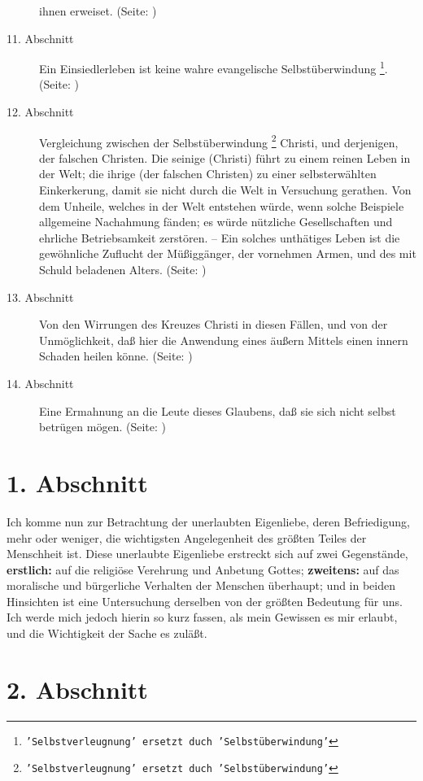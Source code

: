 \begin{description}
ihnen erweiset. (Seite: \pageref{kap5_ab10})
\item[11. Abschnitt] Ein Einsiedlerleben ist keine wahre evangelische
Selbstüberwindung \footnote{\texttt{'Selbstverleugnung' ersetzt duch
'Selbstüberwindung'}}. (Seite: \pageref{kap5_ab11})
\item[12. Abschnitt] Vergleichung zwischen der Selbstüberwindung
\footnote{\texttt{'Selbstverleugnung' ersetzt duch 'Selbstüberwindung'}} Christi, und
derjenigen, der falschen Christen. Die seinige (Christi) führt zu einem reinen
Leben in
der Welt; die ihrige (der falschen Christen) zu einer selbsterwählten
Einkerkerung, damit sie nicht
durch die Welt in Versuchung gerathen. Von dem Unheile, welches in der Welt
entstehen würde, wenn solche Beispiele allgemeine Nachahmung fänden; es würde
nützliche Gesellschaften und ehrliche Betriebsamkeit zerstören. -- Ein solches
unthätiges Leben ist die gewöhnliche Zuflucht der Müßiggänger, der vornehmen
Armen, und des mit Schuld beladenen Alters. (Seite: \pageref{kap5_ab12})
\item[13. Abschnitt] Von den Wirrungen des Kreuzes Christi in diesen Fällen, und
von der Unmöglichkeit, daß hier die Anwendung eines äußern Mittels einen innern
Schaden heilen könne. (Seite: \pageref{kap5_ab13})
\item[14. Abschnitt] Eine Ermahnung an die Leute dieses Glaubens, daß sie sich
nicht selbst betrügen mögen. (Seite: \pageref{kap5_ab14})

\end{description}
\normalsize

\section{1. Abschnitt} \label{kap5_ab1}

Ich komme nun zur Betrachtung der unerlaubten Eigenliebe, deren Befriedigung,
mehr oder weniger, die wichtigsten Angelegenheit des größten Teiles der
Menschheit ist. Diese unerlaubte Eigenliebe erstreckt sich auf zwei Gegenstände,
\textbf{erstlich:} auf die religiöse Verehrung und Anbetung Gottes;
\textbf{zweitens:} auf das
moralische und bürgerliche Verhalten der Menschen überhaupt; und in beiden
Hinsichten ist eine Untersuchung derselben von der größten Bedeutung für uns.
Ich werde mich jedoch hierin so kurz fassen, als mein Gewissen es mir erlaubt,
und die Wichtigkeit der Sache es zuläßt.

\section{2. Abschnitt} \label{kap5_ab2}

